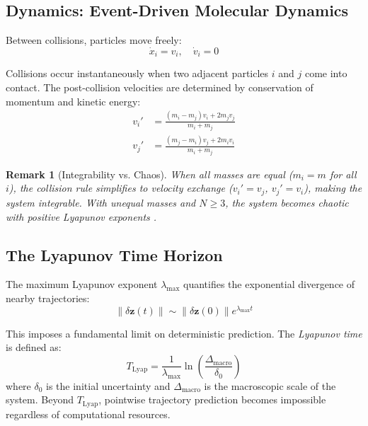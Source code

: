 \documentclass[11pt]{article}
\newtheorem{remark}{Remark}
\begin{document}
\subsection{Dynamics: Event-Driven Molecular Dynamics}

Between collisions, particles move freely:
\begin{equation}
    \dot{x}_i = v_i, \quad \dot{v}_i = 0
\end{equation}

Collisions occur instantaneously when two adjacent particles $i$ and $j$ come into contact. The post-collision velocities are determined by conservation of momentum and kinetic energy:
\begin{align}
    v_i' &= \frac{(m_i - m_j)v_i + 2m_j v_j}{m_i + m_j} \label{eq:collision1} \\
    v_j' &= \frac{(m_j - m_i)v_j + 2m_i v_i}{m_i + m_j} \label{eq:collision2}
\end{align}

\begin{remark}[Integrability vs. Chaos]
When all masses are equal ($m_i = m$ for all $i$), the collision rule simplifies to velocity exchange ($v_i' = v_j$, $v_j' = v_i$), making the system integrable. With unequal masses and $N \geq 3$, the system becomes chaotic with positive Lyapunov exponents \cite{sinai1970dynamical}.
\end{remark}

\subsection{The Lyapunov Time Horizon}

The maximum Lyapunov exponent $\lambda_{\max}$ quantifies the exponential divergence of nearby trajectories:
\begin{equation}
    \|\delta \bm{z}(t)\| \sim \|\delta \bm{z}(0)\| e^{\lambda_{\max} t}
\end{equation}

This imposes a fundamental limit on deterministic prediction. The \textit{Lyapunov time} is defined as:
\begin{equation}
    T_{\text{Lyap}} = \frac{1}{\lambda_{\max}} \ln\left(\frac{\Delta_{\text{macro}}}{\delta_0}\right)
\end{equation}
where $\delta_0$ is the initial uncertainty and $\Delta_{\text{macro}}$ is the macroscopic scale of the system. Beyond $T_{\text{Lyap}}$, pointwise trajectory prediction becomes impossible regardless of computational resources.
\end{document}
